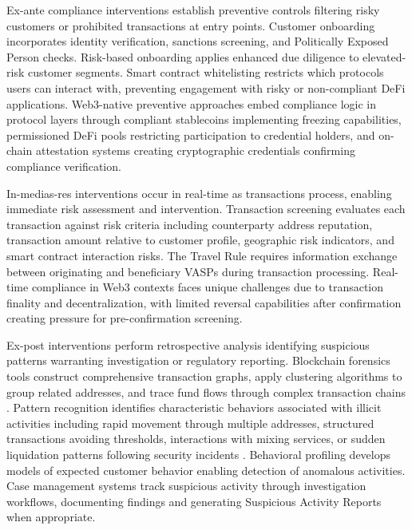 Ex-ante compliance interventions establish preventive controls filtering risky customers or prohibited transactions at entry points. Customer onboarding incorporates identity verification, sanctions screening, and Politically Exposed Person checks. Risk-based onboarding applies enhanced due diligence to elevated-risk customer segments. Smart contract whitelisting restricts which protocols users can interact with, preventing engagement with risky or non-compliant DeFi applications. Web3-native preventive approaches embed compliance logic in protocol layers through compliant stablecoins implementing freezing capabilities, permissioned DeFi pools restricting participation to credential holders, and on-chain attestation systems creating cryptographic credentials confirming compliance verification.

In-medias-res interventions occur in real-time as transactions process, enabling immediate risk assessment and intervention. Transaction screening evaluates each transaction against risk criteria including counterparty address reputation, transaction amount relative to customer profile, geographic risk indicators, and smart contract interaction risks. The Travel Rule requires information exchange between originating and beneficiary VASPs during transaction processing. Real-time compliance in Web3 contexts faces unique challenges due to transaction finality and decentralization, with limited reversal capabilities after confirmation creating pressure for pre-confirmation screening.

Ex-post interventions perform retrospective analysis identifying suspicious patterns warranting investigation or regulatory reporting. Blockchain forensics tools construct comprehensive transaction graphs, apply clustering algorithms to group related addresses, and trace fund flows through complex transaction chains \cite{moser2013inquirymoneylaundering,yousaf2019tracingtransactionscryptocurrency,wu2023tracerscalablegraphbased}. Pattern recognition identifies characteristic behaviors associated with illicit activities including rapid movement through multiple addresses, structured transactions avoiding thresholds, interactions with mixing services, or sudden liquidation patterns following security incidents \cite{monamo2016unsupervisedlearningrobust,pourhabibi2020frauddetectionsystematic}. Behavioral profiling develops models of expected customer behavior enabling detection of anomalous activities. Case management systems track suspicious activity through investigation workflows, documenting findings and generating Suspicious Activity Reports when appropriate.

